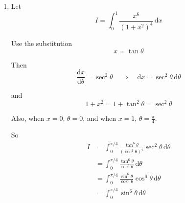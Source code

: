 \documentclass[leqno]{article}
\begin{document}
\begin{enumerate}[
  label=\textbf{\arabic*.},
  leftmargin=*,
  topsep=0pt,
  partopsep=0pt,
  parsep=0pt
]
\begin{djsSolution}
\begin{enumerate}[label=\textbf{(\alph*)}]
  In particular, \(z-z^{-1}=2i\sin\theta\), so
  \[
  (z-z^{-1})^6=(2i\sin\theta)^6=64i^6\sin^6\theta=-64\sin^6\theta
  \]

  Now expand $(z-z^{-1})^6$ by the binomial theorem:
  \begin{align*}
  (z-z^{-1})^6
  &=z^6-6z^5(z^{-1})+15z^4(z^{-1})^2-20z^3(z^{-1})^3 \\
  &\qquad +15z^2(z^{-1})^4-6z(z^{-1})^5+(z^{-1})^6 \\
  &=z^6-6z^4+15z^2-20+15z^{-2}-6z^{-4}+z^{-6}
  \end{align*}

  Therefore
  \begin{align*}
  (z-z^{-1})^6
  &= (z^6+z^{-6})-6(z^4+z^{-4})+15(z^2+z^{-2})-20 \\
  &= 2\cos6\theta-12\cos4\theta+30\cos2\theta-20
  \end{align*}

  Equating this with the earlier result gives
  \[
  -64\sin^6\theta=2\cos6\theta-12\cos4\theta+30\cos2\theta-20
  \]

  so
  \[
  64\sin^6\theta=20-30\cos2\theta+12\cos4\theta-2\cos6\theta
  \]

  and hence
  \[
  \sin^6\theta=\frac{1}{32}\bigl(10-15\cos2\theta+6\cos4\theta-\cos6\theta\bigr)
  \]

  as required.

  \item Let
  \[
  I=\int_0^1 \frac{x^6}{(1+x^2)^4}\,\mathrm{d}x
  \]

  Use the substitution
  \[
  x=\tan\theta
  \]

  Then
  \[
  \frac{\mathrm{d}x}{\mathrm{d}\theta}=\sec^2\theta
  \quad\Longrightarrow\quad
  \mathrm{d}x=\sec^2\theta\,\mathrm{d}\theta
  \]

  and
  \[
  1+x^2=1+\tan^2\theta=\sec^2\theta
  \]

  Also, when $x=0$, $\theta=0$, and when $x=1$, $\theta=\frac{\pi}{4}$.

  So
  \begin{align*}
  I
  &=\int_0^{\pi/4}\frac{\tan^6\theta}{(\sec^2\theta)^4}\sec^2\theta\,\mathrm{d}\theta \\
  &=\int_0^{\pi/4}\frac{\tan^6\theta}{\sec^6\theta}\,\mathrm{d}\theta \\
  &=\int_0^{\pi/4}\frac{\sin^6\theta}{\cos^6\theta}\cos^6\theta\,\mathrm{d}\theta \\
  &=\int_0^{\pi/4}\sin^6\theta\,\mathrm{d}\theta
  \end{align*}


\end{enumerate}
\end{djsSolution}
\end{enumerate}
\end{document}
